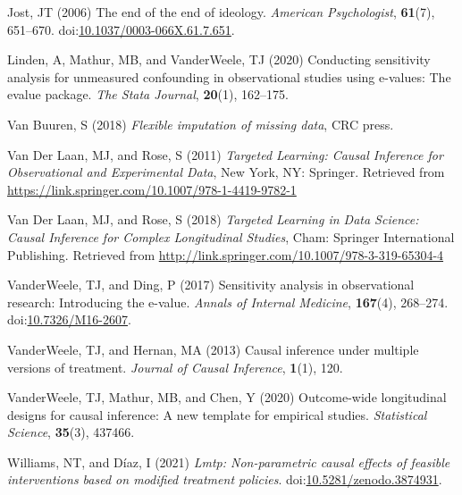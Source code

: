 \documentclass[
  singlecolumn]{article}
\newlength{\cslhangindent}
\newenvironment{CSLReferences}[2] %
 {\begin{list}{}{%
  \setlength{\itemindent}{0pt}
  \setlength{\leftmargin}{0pt}
  \setlength{\parsep}{0pt}
  \ifodd #1
   \setlength{\leftmargin}{\cslhangindent}
   \setlength{\itemindent}{-1\cslhangindent}
  \fi
  \setlength{\itemsep}{#2\baselineskip}}}
 {\end{list}}
\begin{document}
\begin{CSLReferences}{1}{0}
Jost, JT (2006) The end of the end of ideology. \emph{American
Psychologist}, \textbf{61}(7), 651--670.
doi:\href{https://doi.org/10.1037/0003-066X.61.7.651}{10.1037/0003-066X.61.7.651}.

Linden, A, Mathur, MB, and VanderWeele, TJ (2020) Conducting sensitivity
analysis for unmeasured confounding in observational studies using
e-values: The evalue package. \emph{The Stata Journal}, \textbf{20}(1),
162--175.

Van Buuren, S (2018) \emph{Flexible imputation of missing data}, CRC
press.

Van Der Laan, MJ, and Rose, S (2011) \emph{Targeted Learning: Causal
Inference for Observational and Experimental Data}, New York, NY:
Springer. Retrieved from
\url{https://link.springer.com/10.1007/978-1-4419-9782-1}

Van Der Laan, MJ, and Rose, S (2018) \emph{Targeted Learning in Data
Science: Causal Inference for Complex Longitudinal Studies}, Cham:
Springer International Publishing. Retrieved from
\url{http://link.springer.com/10.1007/978-3-319-65304-4}

VanderWeele, TJ, and Ding, P (2017) Sensitivity analysis in
observational research: Introducing the e-value. \emph{Annals of
Internal Medicine}, \textbf{167}(4), 268--274.
doi:\href{https://doi.org/10.7326/M16-2607}{10.7326/M16-2607}.

VanderWeele, TJ, and Hernan, MA (2013) Causal inference under multiple
versions of treatment. \emph{Journal of Causal Inference},
\textbf{1}(1), 120.

VanderWeele, TJ, Mathur, MB, and Chen, Y (2020) Outcome-wide
longitudinal designs for causal inference: A new template for empirical
studies. \emph{Statistical Science}, \textbf{35}(3), 437466.

Williams, NT, and Díaz, I (2021) \emph{Lmtp: Non-parametric causal
effects of feasible interventions based on modified treatment policies}.
doi:\href{https://doi.org/10.5281/zenodo.3874931}{10.5281/zenodo.3874931}.

\end{CSLReferences}
\end{document}
